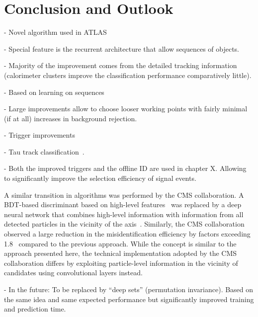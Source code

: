 \section{Conclusion and Outlook}%
\label{sec:tauid_conclusion}

- Novel \tauid algorithm used in ATLAS

- Special feature is the recurrent architecture that allow sequences
of objects.

- Majority of the improvement comes from the detailed tracking
information (calorimeter clusters improve the classification
performance comparatively little).

- Based on learning on sequences

- Large improvements allow to choose looser working points with fairly
minimal (if at all) increases in background rejection.

- Trigger improvements \cite{ATL-DAQ-PUB-2019-001}

- Tau track classification~\cite{Maerker:2021hro}.

- Both the improved triggers and the offline ID are used in chapter
X. Allowing to significantly improve the selection efficiency of
signal events.


A similar transition in \tauid algorithms was performed by the CMS
collaboration. A BDT-based discriminant based on high-level
features~\cite{CMS-TAU-16-003} was replaced by a deep neural network
that combines high-level information with information from all
detected particles in the vicinity of the \tauhadvis
axis~\cite{CMS-TAU-20-001}. Similarly, the CMS collaboration observed
a large reduction in the \faketauhadvis misidentification efficiency
by factors exceeding 1.8~\cite{CMS-TAU-20-001} compared to the
previous approach.  While the concept is similar to the approach
presented here, the technical implementation adopted by the CMS
collaboration differs by exploiting particle-level information in the
vicinity of \tauhadvis candidates using convolutional layers instead.

- In the future: To be replaced by ``deep sets'' (permutation
invariance). Based on the same idea and same expected performance but
significantly improved training and prediction time.

\cite{NIPS2017_f22e4747}


